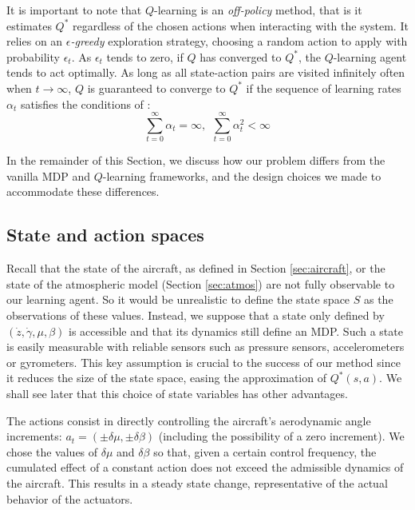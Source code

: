 \documentclass[a4paper, 10pt, conference]{ieeeconf}
\begin{document}
It is important to note that $Q$-learning is an \emph{off-policy} method, that is it estimates $Q^*$ regardless of the chosen actions when interacting with the system. It relies on an \emph{$\epsilon$-greedy} exploration strategy, choosing a random action to apply with probability $\epsilon_t$. As $\epsilon_t$ tends to zero, if $Q$ has converged to $Q^*$, the $Q$-learning agent tends to act optimally. As long as all state-action pairs are visited infinitely often when $t\rightarrow\infty$, $Q$ is guaranteed to converge to $Q^*$ if the sequence of learning rates $\alpha_t$ satisfies the conditions of \cite{robbins1951}: 
\begin{equation*}
\sum_{t=0}^\infty \alpha_t = \infty, \ \
\sum_{t=0}^\infty \alpha_t^2 < \infty
\end{equation*}

In the remainder of this Section, we discuss how our problem differs from the vanilla MDP and $Q$-learning frameworks, and the design choices we made to accommodate these differences.

\subsection{State and action spaces}

Recall that the state of the aircraft, as defined in Section \ref{sec:aircraft}, or the state of the atmospheric model (Section \ref{sec:atmos}) are not fully observable to our learning agent. So it would be unrealistic to define the state space $S$ as the observations of these values. Instead, we suppose that a state only defined by $(\dot{z}, \dot{\gamma}, \mu, \beta)$ is accessible and that its dynamics still define an MDP. Such a state is easily measurable with reliable sensors such as pressure sensors, accelerometers or gyrometers. This key assumption is crucial to the success of our method since it reduces the size of the state space, easing the approximation of $Q^*(s,a)$. We shall see later that this choice of state variables has other advantages.

The actions consist in directly controlling the aircraft's aerodynamic angle increments: $a_t=(\pm\delta\mu,\pm\delta\beta)$ (including the possibility of a zero increment).
We chose the values of $\delta\mu$ and $\delta\beta$ so that, given a certain control frequency, the cumulated effect of a constant action does not exceed the admissible dynamics of the aircraft. This results in a steady state change, representative of the actual behavior of the actuators.
\end{document}
